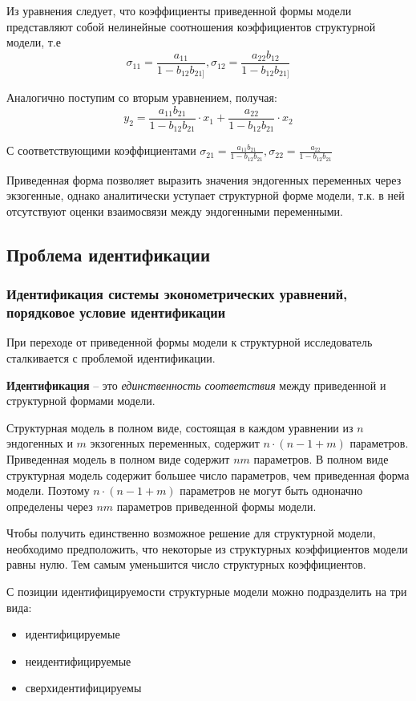 \documentclass[aps,%
12pt,%
final,%
oneside,
onecolumn,%
musixtex, %
superscriptaddress,%
centertags]{article} %
\theoremstyle{plain}
\theoremstyle{definition}
\theoremstyle{remark}
\begin{document}
Из уравнения следует, что коэффициенты приведенной формы модели представляют собой нелинейные соотношения коэффициентов структурной модели, т.е
$$\sigma_{11} =  \frac{a_{11}}{1-b_{12}b_{21]}}, \sigma_{12} = \frac{ a_{22}b_{12}}{1-b_{12}b_{21]}}$$

Аналогично поступим со вторым уравнением, получая:
$$y_2 = \frac{a_{11}b_{21}}{1-b_{12}b_{21}}\cdot x_1 + \frac{ a_{22}}{1-b_{12}b_{21}}\cdot x_2$$

С соответствующими коэффициентами $\sigma_{21} =  \frac{a_{11}b_{21}}{1-b_{12}b_{21}}, \sigma_{22} = \frac{ a_{22}}{1-b_{12}b_{21}}$

Приведенная форма позволяет выразить значения эндогенных переменных через экзогенные, однако аналитически уступает структурной форме модели, т.к. в ней отсутствуют оценки взаимосвязи между эндогенными переменными.


\newpage
\subsection{Проблема идентификации}

\subsubsection{Идентификация системы эконометрических уравнений, порядковое условие идентификации}
При переходе от приведенной формы модели к структурной исследователь сталкивается с проблемой идентификации.

\textbf{Идентификация} – это \textit{единственность соответствия} между приведенной и структурной формами модели.

Структурная модель в полном виде, состоящая в каждом уравнении из $n$ эндогенных и $m$ экзогенных переменных, содержит $n\cdot(n-1+m)$ параметров. Приведенная модель в полном виде содержит $nm$ параметров. В полном виде структурная модель содержит большее число параметров, чем приведенная форма модели. Поэтому $n\cdot(n-1+m)$ параметров не могут быть одноначно определены через $nm$ параметров приведенной формы модели.

Чтобы получить единственно возможное решение для структурной модели, необходимо предположить, что некоторые из структурных коэффициентов модели равны нулю. Тем самым уменьшится число структурных коэффициентов.

С позиции идентифицируемости структурные модели можно подразделить на три вида:

\begin{itemize}
	\item идентифицируемые
	\item неидентифицируемые
	\item сверхидентифицируемы
\end{itemize}
\end{document}
